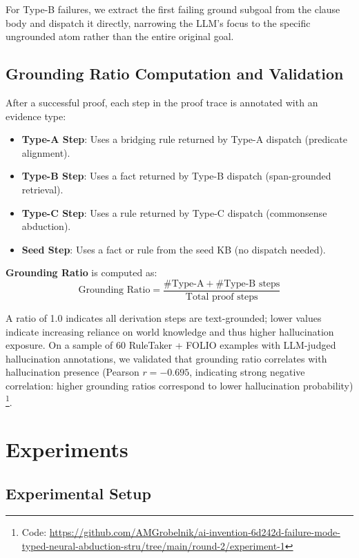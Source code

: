 \documentclass[11pt,letterpaper]{article}
\begin{document}
For Type-B failures, we extract the first failing ground subgoal from the clause body and dispatch it directly, narrowing the LLM's focus to the specific ungrounded atom rather than the entire original goal.

\subsection{Grounding Ratio Computation and Validation}

After a successful proof, each step in the proof trace is annotated with an evidence type:

\begin{itemize}
  \item \textbf{Type-A Step}: Uses a bridging rule returned by Type-A dispatch (predicate alignment).
  \item \textbf{Type-B Step}: Uses a fact returned by Type-B dispatch (span-grounded retrieval).
  \item \textbf{Type-C Step}: Uses a rule returned by Type-C dispatch (commonsense abduction).
  \item \textbf{Seed Step}: Uses a fact or rule from the seed KB (no dispatch needed).
\end{itemize}

\textbf{Grounding Ratio} is computed as:
\[
  \text{Grounding Ratio} = \frac{\#\text{Type-A} + \#\text{Type-B steps}}{\text{Total proof steps}}
\]

A ratio of 1.0 indicates all derivation steps are text-grounded; lower values indicate increasing reliance on world knowledge and thus higher hallucination exposure. On a sample of 60 RuleTaker + FOLIO examples with LLM-judged hallucination annotations, we validated that grounding ratio correlates with hallucination presence (Pearson $r = -0.695$, indicating strong negative correlation: higher grounding ratios correspond to lower hallucination probability)%
\footnote{Code: \url{https://github.com/AMGrobelnik/ai-invention-6d242d-failure-mode-typed-neural-abduction-stru/tree/main/round-2/experiment-1}}.

\section{Experiments}

\subsection{Experimental Setup}
\end{document}
